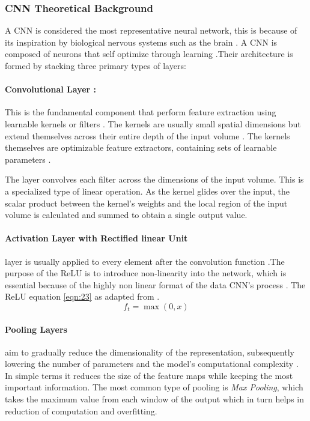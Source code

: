 \subsubsection{CNN Theoretical Background}

A CNN is considered the most representative neural network, this is because of its inspiration by biological nervous systems such as the brain \cite{o2015introduction}. A CNN is composed of neurons that self optimize through learning \cite{o2015introduction}.Their architecture is formed by stacking three primary types of layers:

\paragraph{Convolutional Layer :} This is the fundamental component that perform feature extraction using learnable kernels or filters \cite{yamashita2018convolutional}. The kernels are usually small spatial dimensions but extend themselves across their entire depth of the input volume \cite{ajit2020review}. The kernels themselves are optimizable feature extractors, containing sets of learnable parameters \cite{yamashita2018convolutional}.

The layer convolves each filter across the dimensions of the input volume. This is a specialized type of linear operation. As the kernel glides over the input, the scalar product  between the kernel's weights and the local region of the input volume is calculated and summed to obtain a single output value.

\paragraph{Activation Layer with  Rectified linear Unit} layer is usually applied to every element after the convolution function \cite{o2015introduction}.The purpose of the ReLU is to introduce non-linearity into the network, which is essential because of the highly non linear format of the data CNN's process \cite{wu2017introduction}. The ReLU equation \ref{eqn:23} as adapted from \cite{wu2017introduction}.
\[
f_t = \max (0,x)
\label{eqn:23}
\]
\paragraph{Pooling Layers} aim to gradually reduce the dimensionality of the representation, subsequently lowering the number of parameters and the model's computational complexity \cite{li2021survey}. In simple terms it reduces the size of the feature maps while keeping the most important information. The most common type of pooling is \textit{Max Pooling}, which takes the maximum value from each window of the output  which in turn helps in reduction of computation and overfitting.

